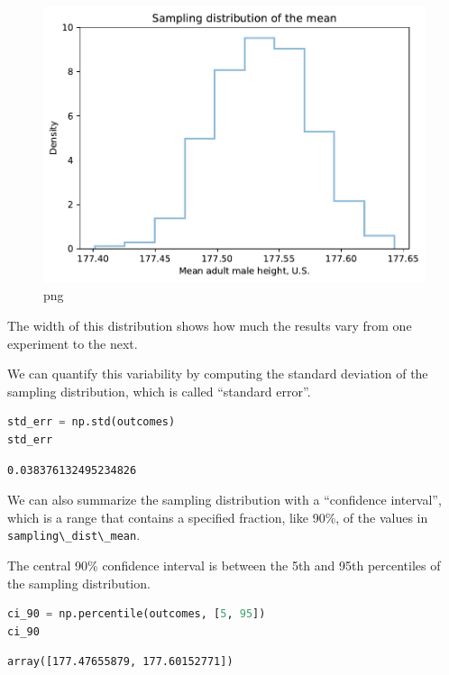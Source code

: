 \begin{figure}
\centering
\includegraphics{11_inference_files/11_inference_105_0.pdf}
\caption{png}
\end{figure}

The width of this distribution shows how much the results vary from one
experiment to the next.

We can quantify this variability by computing the standard deviation of
the sampling distribution, which is called ``standard error''.

\begin{lstlisting}[language=Python,style=source]
std_err = np.std(outcomes)
std_err
\end{lstlisting}

\begin{lstlisting}[style=output]
0.038376132495234826
\end{lstlisting}

We can also summarize the sampling distribution with a ``confidence
interval'', which is a range that contains a specified fraction, like
90\%, of the values in \passthrough{\lstinline!sampling\_dist\_mean!}.

The central 90\% confidence interval is between the 5th and 95th
percentiles of the sampling distribution.

\begin{lstlisting}[language=Python,style=source]
ci_90 = np.percentile(outcomes, [5, 95])
ci_90
\end{lstlisting}

\begin{lstlisting}[style=output]
array([177.47655879, 177.60152771])
\end{lstlisting}

